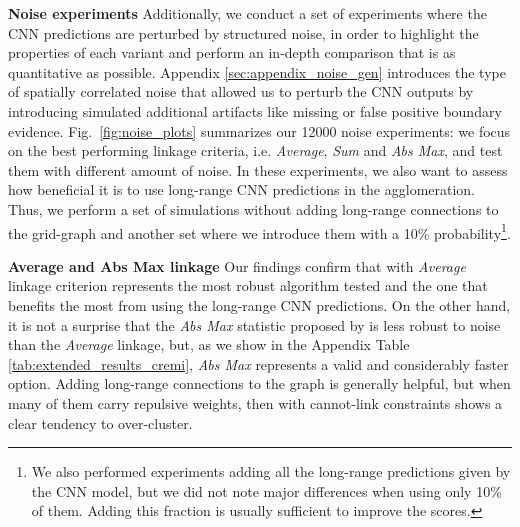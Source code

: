 \textbf{Noise experiments }  Additionally, we conduct a set of experiments where the CNN predictions are perturbed by structured noise, in order to highlight the properties of each \algname{} variant and perform an in-depth comparison that is as quantitative as possible. Appendix \ref{sec:appendix_noise_gen} introduces the type of spatially correlated noise that allowed us to perturb the CNN outputs by introducing simulated additional artifacts like missing or false positive boundary evidence. 
Fig.~\ref{fig:noise_plots} summarizes our 12000 noise experiments: we focus on the best performing linkage criteria, i.e. \emph{Average}, \emph{Sum} and \emph{Abs Max}, and test them with different amount of noise. 
In these experiments, we also want to assess how beneficial it is to use long-range CNN predictions in the agglomeration. Thus, we perform a set of simulations without adding long-range connections to the grid-graph and another set where we introduce them with a 10\% probability\footnote{We also performed experiments adding all the long-range predictions given by the CNN model, but we did not note major differences when using only 10\% of them. Adding this fraction is usually sufficient to improve the scores.}.

\textbf{Average and Abs Max linkage } Our findings confirm that \algname{} with \emph{Average} linkage criterion represents the most robust algorithm tested and the one that benefits the most from using the long-range CNN predictions. On the other hand, it is not a surprise that the \emph{Abs Max} statistic proposed by \cite{wolf2018mutex} is less robust to noise than the \emph{Average} linkage, but, as we show in the Appendix Table \ref{tab:extended_results_cremi}, \emph{Abs Max} represents a valid and considerably faster option. 
Adding long-range connections to the graph is generally helpful, but when many of them carry repulsive weights, then \algname{} with cannot-link constraints shows a clear tendency to over-cluster.    

